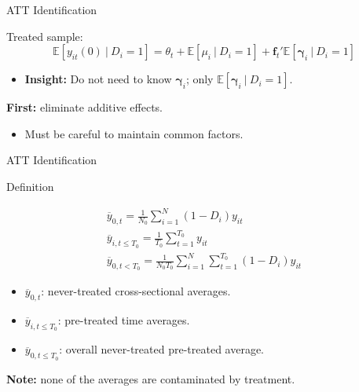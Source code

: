 \documentclass{beamer}
\newcommand{\1}{\mathds{1}} %
\newcommand{\condexpec}[2]{\mathbb{E}\left[#1 \ \vert \ #2\right]}
\begin{document}
\begin{frame}{ATT Identification}

Treated sample:
\begin{equation}
    \condexpec{y_{it}(0)}{D_i = 1} = \theta_t + \condexpec{\mu_i}{D_i = 1} + \bm f_t' \condexpec{\bm \gamma_i}{D_i = 1}
\end{equation}
\begin{itemize} 
    \item \textbf{Insight:} Do not need to know $\bm \gamma_i$; only $\condexpec{\bm \gamma_i}{D_i = 1}$.
\end{itemize}

\vspace{.5cm}

\textbf{First:} eliminate additive effects. 
\begin{itemize}
    \item Must be careful to maintain common factors. 
\end{itemize}
    
\end{frame}


\begin{frame}{ATT Identification}

\begin{block}{Definition}

\vspace{-.25 cm}

    \begin{gather*}
    \overline{y}_{0 , t} = \frac{1}{N_{0}} \sum_{i = 1}^N (1 - D_i) y_{it} \\
    \overline{y}_{i,t\leq T_0} = \frac{1}{T_0} \sum_{t = 1}^{T_0} y_{it} \\
    \overline{y}_{0, t < T_0} = \frac{1}{N_{0} T_0} \sum_{i = 1}^N \sum_{t = 1}^{T_0} (1 - D_i) y_{it}
\end{gather*}
\end{block}

\begin{itemize}
    \item $\overline{y}_{0,t}$: never-treated cross-sectional averages.
    \item $\overline{y}_{i,t \leq T_0}$: pre-treated time averages.
    \item $\overline{y}_{0, t \leq T_0}$: overall never-treated pre-treated average. 
\end{itemize}

\vspace{.25 cm}

\textbf{Note:} none of the averages are contaminated by treatment. 


    
\end{frame}
\end{document}
